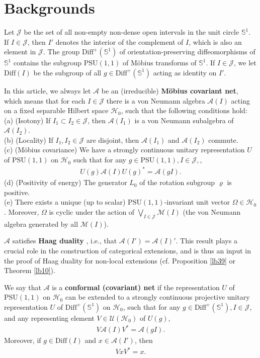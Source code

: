 \documentclass[12pt,a4paper]{article}
\theoremstyle{definition}
\theoremstyle{plain}
\newcommand{\mc}{\mathcal}
\newcommand{\Diffp}{\mathrm{Diff}^+}
\newcommand{\Diff}{\mathrm{Diff}}
\newcommand{\PSU}{\mathrm{PSU}(1,1)}
\newcommand{\mbb}{\mathbb}
\numberwithin{equation}{section}
\begin{document}
\section{Backgrounds}\label{lb29}

Let $\mc J$ be the set of all non-empty non-dense open intervals in the unit circle $\mbb S^1$. If $I\in\mc J$, then $I'$ denotes the interior of the complement of $I$, which is also an element in $\mc J$. The group $\Diffp(\mbb S^1)$ of orientation-preserving diffeomorphisms of $\mbb S^1$ contains the subgroup $\PSU$ of M\"obius transforms of $\mbb S^1$. If $I\in\mc J$, we let $\Diff(I)$ be the subgroup of all $g\in\Diffp(\mbb S^1)$ acting as identity on $I'$.

In this article, we always let $\mc A$ be an (irreducible) \textbf{M\"obius covariant net}, which means that for each $I\in\mathcal J$ there is a von Neumann algebra $\mathcal A(I)$ acting on a fixed separable Hilbert space $\mathcal H_0$, such that the following conditions hold:\\
(a) (Isotony) If $I_1\subset I_2\in\mathcal J$, then $\mathcal A(I_1)$ is a von Neumann subalgebra of $\mathcal A(I_2)$.\\
(b) (Locality) If $I_1,I_2\in\mathcal J$ are disjoint, then $\mathcal A(I_1)$ and $\mathcal A(I_2)$ commute.\\
(c) (M\"obius covariance) We have a strongly continuous  unitary representation $U$ of $\PSU$ on $\mc H_0$ such that for any $g\in\PSU, I\in\mc J,$, 
\begin{align*}
U(g)\mc A(I)U(g)^*=\mc A(gI).
\end{align*}
(d) (Positivity of energy) The generator $L_0$ of the rotation subgroup $\varrho$  is positive.\\
(e) There exists a  unique (up to scalar) $\PSU$-invariant unit vector $\Omega\in\mathcal H_0$. Moreover, $\Omega$ is  cyclic under the action of $\bigvee_{I\in\mathcal J}\mathcal M(I)$ (the von Neumann algebra generated by all $\mathcal M(I)$).

$\mc A$ satisfies \textbf{Haag duality} \cite[Thm. 2.19]{GF93}, i.e., that $\mc A(I')=\mc A(I)'$. This result plays a crucial role in the construction of categorical extensions, and is thus an input in the proof of Haag duality for non-local extensions (cf. Proposition \ref{lb39} or Theorem \ref{lb10}). 

We say that $\mc A$ is a \textbf{conformal (covariant) net} if the representation $U$ of $\PSU$ on $\mc H_0$ can be extended to a strongly continuous projective unitary representation $U$ of $\Diffp(\mbb S^1)$ on $\mathcal H_0$, such that for any $g\in \Diffp(\mbb S^1),I\in\mathcal J$, and any representing element $V\in\mathcal U(\mathcal H_0)$ of $U(g)$,
\begin{align*}
V\mathcal A(I)V^*=\mathcal A(gI).
\end{align*}
Moreover, if $g\in\Diff(I)$ and $x\in\mathcal A(I')$, then
\begin{align*}
VxV^*=x.
\end{align*}
\end{document}
